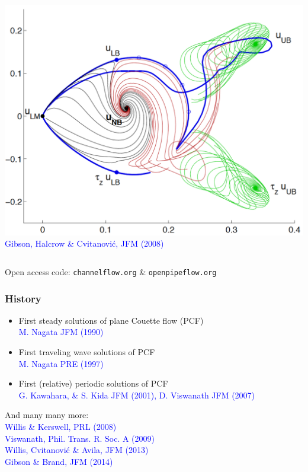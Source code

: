 \documentclass[mathserif]{beamer} %
\begin{document}
\begin{frame}
\begin{columns}
\includegraphics[width=\textwidth]{GHC_JFM08_ss}\\
{\tiny \textcolor{blue}{Gibson, Halcrow \& Cvitanovi\'c, JFM (2008)}}
\end{columns}
\vspace{.5cm}
Open access code: \texttt{channelflow.org} \& \texttt{openpipeflow.org}
\end{frame}
%
\begin{frame}
\frametitle{History}
\begin{itemize}
	\item {\small First steady solutions of plane Couette flow (PCF)}\\
	{\tiny \textcolor{blue}{M. Nagata JFM (1990)}}
	\item {\small First traveling wave solutions of PCF}\\
	{\tiny \textcolor{blue}{M. Nagata PRE (1997)}}
	\item {\small First (relative) periodic solutions of PCF}\\
	{\tiny \textcolor{blue}{G. Kawahara, \& S. Kida JFM (2001), D. Viswanath JFM (2007)}}
\end{itemize}
And many many more:\\
{\tiny \textcolor{blue}{Willis \& Kerswell, PRL (2008)}}\\
{\tiny \textcolor{blue}{Viswanath, Phil. Trans. R. Soc. A (2009)}}\\
{\tiny \textcolor{blue}{Willis, Cvitanovi\'c \& Avila, JFM (2013)}}\\
{\tiny \textcolor{blue}{Gibson \& Brand, JFM (2014)}}
\end{frame}
\end{document}
